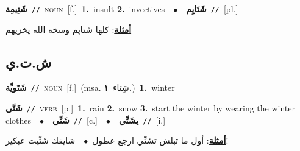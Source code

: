 \documentclass[10pt,a4paper,twoside]{article} %
\begin{document}
\begin{multicols}{2}
{\setlength\topsep{0pt}\textbf{\foreignlanguage{arabic}{شَتِيمِة}}\ {\color{gray}\texttt{//}\color{black}}\ \textsc{noun}\ [f.]\ \textbf{1.}~insult  \textbf{2.}~invectives\ \ $\bullet$\ \ \setlength\topsep{0pt}\textbf{\foreignlanguage{arabic}{شَتَايِم}}\ {\color{gray}\texttt{//}\color{black}}\ [pl.]\  \begin{flushright}\color{gray}\foreignlanguage{arabic}{\textbf{\underline{\foreignlanguage{arabic}{أمثلة}}}: كلها شَتايِم وسخة الله يخزيهم}\end{flushright}\color{black}} \vspace{2mm}

\vspace{-3mm}
\subsection*{\color{blue}\foreignlanguage{arabic}{ش.ت.ي}\color{blue}{}} 

{\setlength\topsep{0pt}\textbf{\foreignlanguage{arabic}{شَتَويِّة}}\ {\color{gray}\texttt{//}\color{black}}\ \textsc{noun}\ [f.]\ \color{gray}(msa. \foreignlanguage{arabic}{شِتاء}~\foreignlanguage{arabic}{\textbf{١.}})\color{black}\ \textbf{1.}~winter\ } \vspace{2mm}

{\setlength\topsep{0pt}\textbf{\foreignlanguage{arabic}{شَتَّى}}\ {\color{gray}\texttt{//}\color{black}}\ \textsc{verb}\ [p.]\ \textbf{1.}~rain  \textbf{2.}~snow  \textbf{3.}~start the winter by wearing the winter clothes\ \ $\bullet$\ \ \setlength\topsep{0pt}\textbf{\foreignlanguage{arabic}{شَتِّي}}\ {\color{gray}\texttt{//}\color{black}}\ [c.]\ \ $\bullet$\ \ \setlength\topsep{0pt}\textbf{\foreignlanguage{arabic}{يشَتِّي}}\ {\color{gray}\texttt{//}\color{black}}\ [i.]\  \begin{flushright}\color{gray}\foreignlanguage{arabic}{\textbf{\underline{\foreignlanguage{arabic}{أمثلة}}}: أول ما تبلش تشَتِّي ارجع عطول\ $\bullet$\ \  شايفك شَتِّيت عبكير!}\end{flushright}\color{black}} \vspace{2mm}


\end{multicols}
\end{document}
